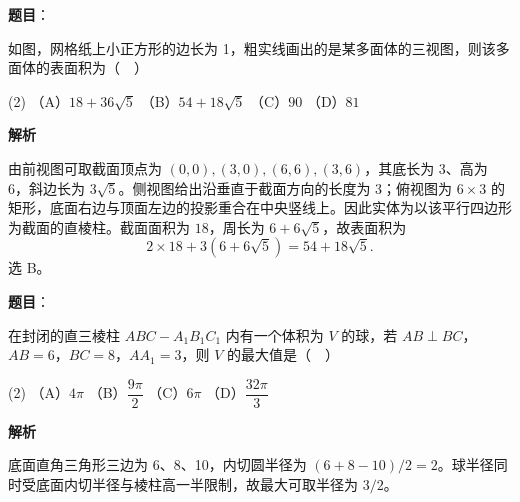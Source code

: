 \begin{answer}

\textbf{题目}：

如图，网格纸上小正方形的边长为 1，粗实线画出的是某多面体的三视图，则该多面体的表面积为（　）
\nopagebreak[4]
\begin{center}\end{center}
\nopagebreak[4]
\begin{gkopts}(2)
\task （A）\(18+36\sqrt5\)
\task （B）\(54+18\sqrt5\)
\task （C）\(90\)
\task （D）\(81\)
\end{gkopts}

\textbf{解析}

由前视图可取截面顶点为 \((0,0),(3,0),(6,6),(3,6)\)，其底长为 3、高为 6，斜边长为 \(3\sqrt5\)。侧视图给出沿垂直于截面方向的长度为 3；俯视图为 \(6\times3\) 的矩形，底面右边与顶面左边的投影重合在中央竖线上。因此实体为以该平行四边形为截面的直棱柱。截面面积为 \(18\)，周长为 \(6+6\sqrt5\)，故表面积为
\nopagebreak[4]
\[
2\times18+3(6+6\sqrt5)=54+18\sqrt5.
\]
选 B。


\end{answer}
\begin{answer}

\textbf{题目}：

在封闭的直三棱柱 \(ABC-A_1B_1C_1\) 内有一个体积为 \(V\) 的球，若 \(AB\perp BC\)，\(AB=6\)，\(BC=8\)，\(AA_1=3\)，则 \(V\) 的最大值是（　）

\begin{gkopts}(2)
\task （A）\(4\pi\)
\task （B）\(\dfrac{9\pi}{2}\)
\task （C）\(6\pi\)
\task （D）\(\dfrac{32\pi}{3}\)
\end{gkopts}

\textbf{解析}

底面直角三角形三边为 6、8、10，内切圆半径为 \((6+8-10)/2=2\)。球半径同时受底面内切半径与棱柱高一半限制，故最大可取半径为 \(3/2\)。


\end{answer}
